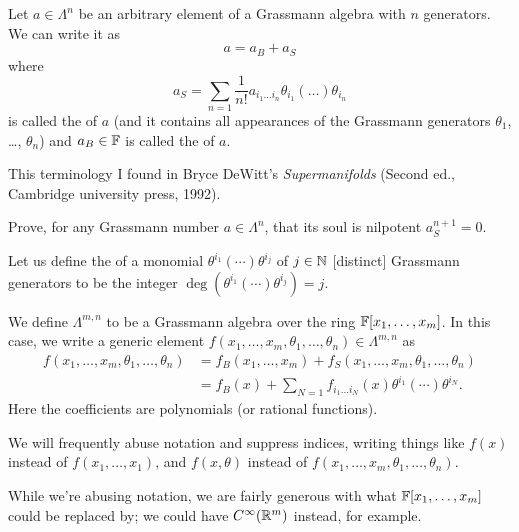 \begin{definition}
Let $a\in\Lambda^{n}$ be an arbitrary element of a Grassmann algebra
with $n$ generators. We can write it as
\begin{equation}
a = a_{B} + a_{S}
\end{equation}
where
\begin{equation}
a_{S} = \sum_{n=1}\frac{1}{n!}a_{i_{1}\dots i_{n}}\theta_{i_{1}}(\dots)\theta_{i_{n}}
\end{equation}
is called the  of $a$ (and it contains all appearances of the
Grassmann generators $\theta_{1}$, \dots, $\theta_{n}$) and
$a_{B}\in\mathbb{F}$ is called the  of $a$.
\end{definition}

\begin{remark}
This terminology I found in Bryce DeWitt's \textit{Supermanifolds}
(Second ed., Cambridge university press, 1992).
\end{remark}

\begin{exercise}
Prove, for any Grassmann number $a\in\Lambda^{n}$, that its soul is nilpotent $a_{S}^{n+1}=0$.
\end{exercise}

\begin{definition}
Let us define the  of a monomial
$\theta^{i_{1}}(\cdots)\theta^{i_{j}}$ of $j\in\mathbb{N}$ [distinct] Grassmann generators
to be the integer $\deg(\theta^{i_{1}}(\cdots)\theta^{i_{j}})=j$.
\end{definition}

\begin{definition}
We define $\Lambda^{m,n}$ to be a Grassmann algebra over the ring
$\mathbb{F}[x_{1},\dots,x_{m}]$. In this case, we write a generic element
$f(x_{1},\dots,x_{m},\theta_{1},\dots,\theta_{n})\in\Lambda^{m,n}$ as
\begin{equation}
  \begin{split}
  f(x_{1},\dots,x_{m},\theta_{1},\dots,\theta_{n})
&= f_{B}(x_{1},\dots,x_{m}) + f_{S}(x_{1},\dots,x_{m},\theta_{1},\dots,\theta_{n})\\
&= f_{B}(x) + \sum_{N=1}f_{i_{1}\dots i_{N}}(x)\theta^{i_{1}}(\cdots)\theta^{i_{N}}.
  \end{split}
\end{equation}
Here the coefficients are polynomials (or rational functions).
\end{definition}

\begin{remark}
We will frequently abuse notation and suppress indices, writing things
like $f(x)$ instead of $f(x_{1},\dots,x_{1})$, and $f(x,\theta)$ instead
of $f(x_{1},\dots,x_{m},\theta_{1},\dots,\theta_{n})$.

While we're abusing notation, we are fairly generous with what
$\mathbb{F}[x_{1},\dots,x_{m}]$ could be replaced by; we could have
$C^{\infty}(\mathbb{R}^{m})$ instead, for example.
\end{remark}

